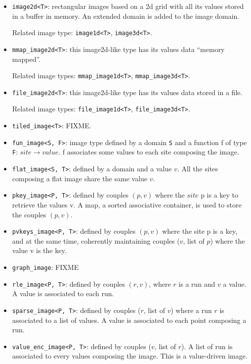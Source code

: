 \begin{itemize}

\item{\verb+image2d<T>+}: rectangular images based on a 2d grid with all its
values stored in a buffer in memory. An extended domain is added to the image
domain.

Related image type: \verb+image1d<T>+, \verb+image3d<T>+.


\item{\verb+mmap_image2d<T>+:}  this image2d-like type has its values data
``memory mapped''.

Related image types: \verb+mmap_image1d<T>+, \verb+mmap_image3d<T>+.

\item{\verb+file_image2d<T>+:} this image2d-like type has its values data
stored in a file.

Related image types: \verb+file_image1d<T>+, \verb+file_image3d<T>+.

\item{\verb+tiled_image<T>+:} FIXME.

\item{\verb+fun_image<S, F>+:} image type defined by a domain \verb+S+ and a
function f of type \verb+F+: $site \rightarrow value$.
f associates some values to each site composing the image.

\item{\verb+flat_image<S, T>+:} defined by a domain and a value $v$.
All the sites composing a flat image share the same value $v$.

\item{\verb+pkey_image<P, T>+:} defined by couples $(p,v)$ where the $site$ p
is a key to retrieve the values v. A map, a sorted associative container, is
used to store the couples $(p,v)$.

\item{\verb+pvkeys_image<P, T>+:} defined by couples $(p,v)$ where  the site p is a key, and at the same time, coherently maintaining couples
($v$, list of $p$) where the value v is the key.


\item{\verb+graph_image+:} FIXME

\item{\verb+rle_image<P, T>+:} defined by couples $(r, v)$, where $r$ is a run
and $v$ a value. A value is associated to each run.

\item{\verb+sparse_image<P, T>+:} defined by couples ($r$, list of $v$) where a
run $r$ is associated to a list of values. A value is associated to each
point composing a run.

\item{\verb+value_enc_image<P, T>+:} defined by couples ($v$, list of $r$).
A list of run is associated to every values composing the image. This is a
value-driven image.

\end{itemize}

